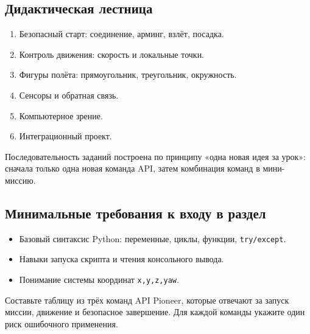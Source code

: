 \subsection{Дидактическая лестница}
\begin{enumerate}
\item Безопасный старт: соединение, арминг, взлёт, посадка.
\item Контроль движения: скорость и локальные точки.
\item Фигуры полёта: прямоугольник, треугольник, окружность.
\item Сенсоры и обратная связь.
\item Компьютерное зрение.
\item Интеграционный проект.
\end{enumerate}

\begin{infobox}
Последовательность заданий построена по принципу «одна новая идея за урок»: сначала только одна новая команда API, затем комбинация команд в мини-миссию.
\end{infobox}

\subsection{Минимальные требования к входу в раздел}
\begin{itemize}
\item Базовый синтаксис Python: переменные, циклы, функции, \texttt{try/except}.
\item Навыки запуска скрипта и чтения консольного вывода.
\item Понимание системы координат \texttt{x,y,z,yaw}.
\end{itemize}

\begin{taskbox}
Составьте таблицу из трёх команд API Pioneer, которые отвечают за запуск миссии, движение и безопасное завершение. Для каждой команды укажите один риск ошибочного применения.
\end{taskbox}
